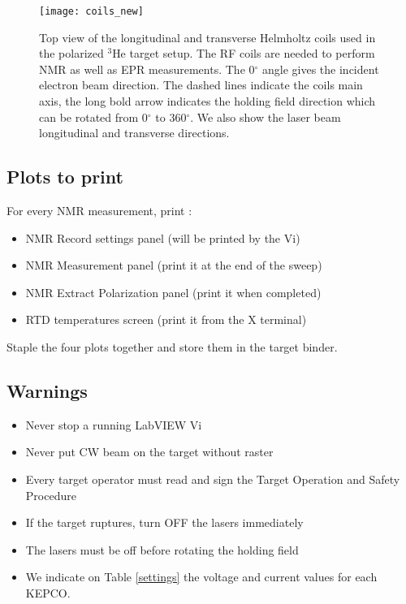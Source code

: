 \begin{figure}
\begin{center}
\centerline{\texttt{[image: coils\_new]}}
\caption{Top view of the longitudinal and transverse Helmholtz coils
used in the polarized $^3$He target setup. 
The RF coils are needed to perform NMR as well as EPR measurements. The
0$^{\circ}$ angle gives the incident electron
beam direction. The
dashed lines indicate the coils main axis, the long bold 
arrow indicates the holding field direction which can be 
rotated from 0$^{\circ}$
to 360$^{\circ}$. We also show the laser beam
longitudinal and transverse directions.}
\label{fig:nmr}
\end{center}
\end{figure}

\subsection{Plots to print}

For every NMR measurement, print :

\begin{itemize}
\item{NMR Record settings panel (will be printed by the Vi)}
\item{NMR Measurement panel (print it at the end of the sweep)}
\item{NMR Extract Polarization panel (print it when completed)}
\item{RTD temperatures screen (print it from the X terminal)}
\end{itemize}

Staple the four plots together and store them in the target binder.

\subsection{Warnings}

\begin{itemize}
\item{Never stop a running LabVIEW Vi}
\item{Never put CW beam on the target without raster}
\item{Every target operator must read and sign the Target Operation and Safety 
Procedure}
\item{If the target ruptures, turn OFF the lasers immediately}
\item{The lasers must be off before rotating the holding field}
\item{We indicate on Table \ref{settings} the voltage and 
current values for each KEPCO.}
\end{itemize}

